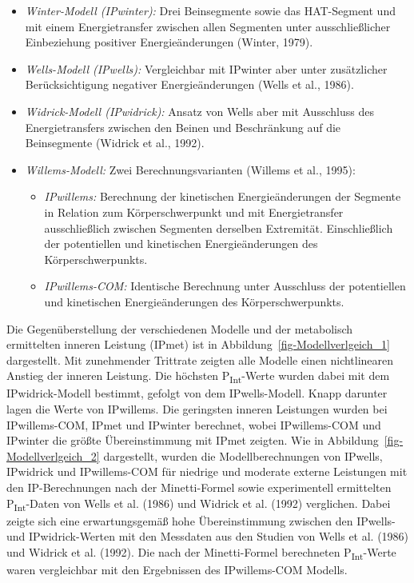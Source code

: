 \documentclass[
  letterpaper,
  DIV=11]{scrartcl}
\begin{document}
\begin{itemize}
\item
  \emph{Winter-Modell (IPwinter):} Drei Beinsegmente sowie das
  HAT-Segment und mit einem Energietransfer zwischen allen Segmenten
  unter ausschließlicher Einbeziehung positiver Energieänderungen
  (Winter, 1979).
\item
  \emph{Wells-Modell (IPwells):} Vergleichbar mit IPwinter aber unter
  zusätzlicher Berücksichtigung negativer Energieänderungen (Wells et
  al., 1986).
\item
  \emph{Widrick-Modell (IPwidrick):} Ansatz von Wells aber mit
  Ausschluss des Energietransfers zwischen den Beinen und Beschränkung
  auf die Beinsegmente (Widrick et al., 1992).
\item
  \emph{Willems-Modell:} Zwei Berechnungsvarianten (Willems et al.,
  1995):

  \begin{itemize}
  \item
    \emph{IPwillems:} Berechnung der kinetischen Energieänderungen der
    Segmente in Relation zum Körperschwerpunkt und mit Energietransfer
    ausschließlich zwischen Segmenten derselben Extremität.
    Einschließlich der potentiellen und kinetischen Energieänderungen
    des Körperschwerpunkts.
  \item
    \emph{IPwillems-COM:} Identische Berechnung unter Ausschluss der
    potentiellen und kinetischen Energieänderungen des
    Körperschwerpunkts.
  \end{itemize}
\end{itemize}

Die Gegenüberstellung der verschiedenen Modelle und der metabolisch
ermittelten inneren Leistung (IPmet) ist in
Abbildung~\ref{fig-Modellverlgeich_1} dargestellt. Mit zunehmender
Trittrate zeigten alle Modelle einen nichtlinearen Anstieg der inneren
Leistung. Die höchsten P\textsubscript{Int}-Werte wurden dabei mit dem
IPwidrick-Modell bestimmt, gefolgt von dem IPwells-Modell. Knapp
darunter lagen die Werte von IPwillems. Die geringsten inneren
Leistungen wurden bei IPwillems-COM, IPmet und IPwinter berechnet, wobei
IPwillems-COM und IPwinter die größte Übereinstimmung mit IPmet zeigten.
Wie in Abbildung~\ref{fig-Modellverlgeich_2} dargestellt, wurden die
Modellberechnungen von IPwells, IPwidrick und IPwillems-COM für niedrige
und moderate externe Leistungen mit den IP-Berechnungen nach der
Minetti-Formel sowie experimentell ermittelten
P\textsubscript{Int}-Daten von Wells et al. (1986) und Widrick et al.
(1992) verglichen. Dabei zeigte sich eine erwartungsgemäß hohe
Übereinstimmung zwischen den IPwells- und IPwidrick-Werten mit den
Messdaten aus den Studien von Wells et al. (1986) und Widrick et al.
(1992). Die nach der Minetti-Formel berechneten
P\textsubscript{Int}-Werte waren vergleichbar mit den Ergebnissen des
IPwillems-COM Modells.
\end{document}
